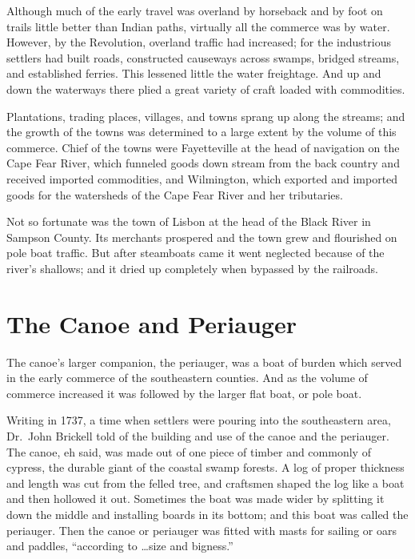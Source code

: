 \documentclass[11pt, a5paper, openright]{book}
\begin{document}
Although much of the early travel was overland by horseback and by
foot on trails little better than Indian paths, virtually all the
commerce was by water.  However, by the Revolution, overland traffic
had increased; for the industrious settlers had built roads,
constructed causeways across swamps, bridged streams, and established
ferries.  This lessened little the water freightage.  And up and down
the waterways there plied a great variety of craft loaded with
commodities.\par

Plantations, trading places, villages, and towns sprang up along the
streams; and the growth of the towns was determined to a large extent
by the volume of this commerce.  Chief of the towns were Fayetteville
at the head of navigation on the Cape Fear River, which funneled goods
down stream from the back country and received imported commodities,
and Wilmington, which exported and imported goods for the watersheds
of the Cape Fear River and her tributaries.\par

Not so fortunate was the town of Lisbon at the head of the Black River
in Sampson County.  Its merchants prospered and the town grew and
flourished on pole boat traffic.  But after steamboats came it went
neglected because of the river's shallows; and it dried up completely
when bypassed by the railroads.\par

\section{The Canoe and Periauger}

The canoe's larger companion, the periauger, was a boat of burden
which served in the early commerce of the southeastern counties.  And
as the volume of commerce increased it was followed by the larger flat
boat, or pole boat.\par

Writing in 1737, a time when settlers were pouring into the
southeastern area, Dr.\ John Brickell told of the building and use of
the canoe and the periauger.  The canoe, eh said, was made out of one
piece of timber and commonly of cypress, the durable giant of the
coastal swamp forests.  A log of proper thickness and length was cut
from the felled tree, and craftsmen shaped the log like a boat and
then hollowed it out.  Sometimes the boat was made wider by splitting
it down the middle and installing boards in its bottom; and this boat
was called the periauger.  Then the canoe or periauger was fitted with
masts for sailing or oars and paddles, ``according to \ldots size and
bigness.''\par
\end{document}
